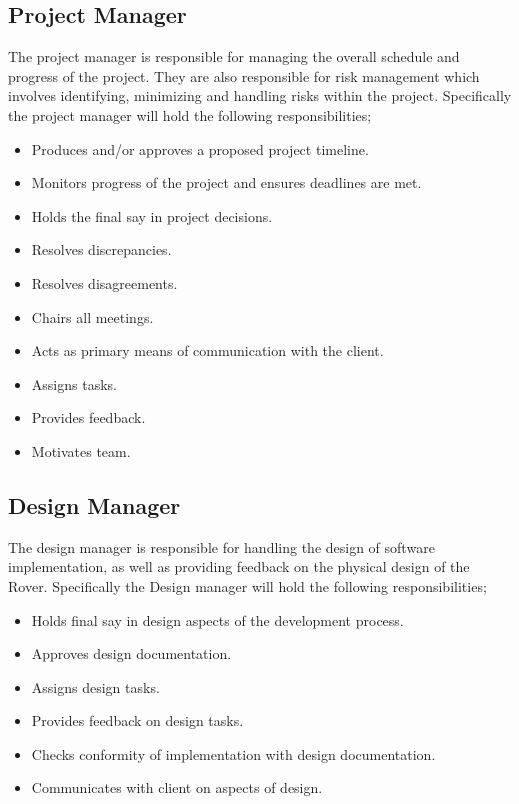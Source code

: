 \documentclass{article}
\begin{document}
\begin{adjustwidth}{0em}{0pt}
\subsection{Project Manager}
\begin{adjustwidth}{1em}{0pt}
The project manager is responsible for managing the overall schedule and progress of the project. They are also responsible for risk management which involves identifying, minimizing and handling risks within the project. Specifically the project manager will hold the following responsibilities; 
\begin{itemize}
\item Produces and/or approves a proposed project timeline. 
\item Monitors progress of the project and ensures deadlines are met.
\item Holds the final say in project decisions. 
\item Resolves discrepancies.
\item Resolves disagreements.
\item Chairs all meetings. 
\item Acts as primary means of communication with the client. 
\item Assigns tasks. 
\item Provides feedback. 
\item Motivates team.
\end{itemize}
\end{adjustwidth}

\subsection{Design Manager}
\begin{adjustwidth}{1em}{0pt}
The design manager is responsible for handling the design of software implementation, as well as providing feedback on the physical design of the Rover. Specifically the Design manager will hold the following responsibilities;
\begin{itemize}
\item Holds final say in design aspects of the development process.
\item Approves design documentation. 
\item Assigns design tasks.
\item Provides feedback on design tasks.
\item Checks conformity of implementation with design documentation. 
\item Communicates with client on aspects of design.
\end{itemize}
\end{adjustwidth}


\end{adjustwidth}
\end{document}
